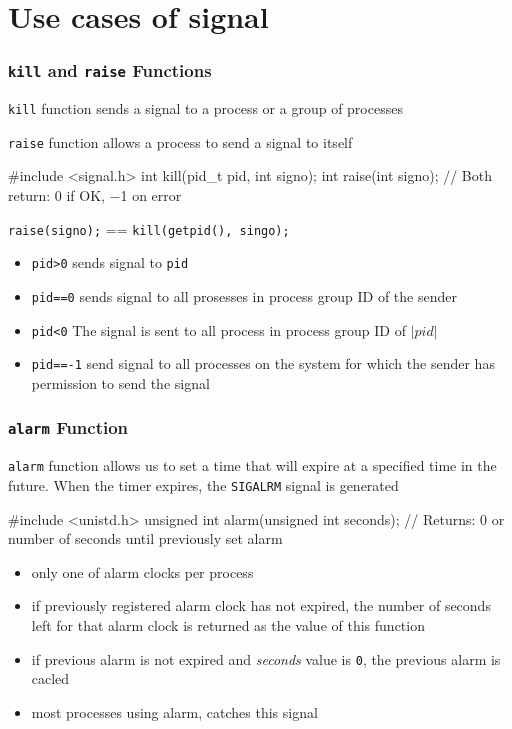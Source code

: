 \documentclass[newPxFont,sthlmFooter,nooffset]{beamer}
\begin{document}
\section{Use cases of signal}



\begin{frame}[fragile,t]
  \frametitle{\texttt{kill} and \texttt{raise} Functions}
\texttt{kill} function sends a signal to a process or a group of processes

\texttt{raise} function allows a process to send a signal to itself

\begin{codedef}
#include <signal.h>
int kill(pid_t pid, int signo); 
int raise(int signo);
// Both return: 0 if OK, −1 on error
\end{codedef}

{\hfill \texttt{raise(signo);} == \texttt{kill(getpid(), singo);}\hfill}

\begin{itemize}
\item \texttt{pid>0} sends signal to \texttt{pid}
\item \texttt{pid==0} sends signal to all prosesses in process group ID of the sender
\item \texttt{pid<0} The signal is sent to all process in process group ID of $|pid|$
\item \texttt{pid==-1} send signal to all processes on the system for which the sender has permission to send the signal
\end{itemize}
\end{frame}



\begin{frame}[fragile,t]
  \frametitle{\texttt{alarm} Function}
\texttt{alarm} function allows us to set a time that will expire at a specified time in the future. When the timer expires, the \texttt{SIGALRM} signal is generated
\begin{codedef}
#include <unistd.h>
unsigned int alarm(unsigned int seconds);
// Returns: 0 or number of seconds until previously set alarm  
\end{codedef}

\begin{itemize}
\item only one of alarm clocks per process
\item if previously registered alarm clock has not expired, the number of seconds left for that alarm clock is returned as the value of this function
\item if previous alarm is not expired and \textit{seconds} value is \texttt{0}, the previous alarm is cacled
\item most processes using alarm, catches this signal
\end{itemize}
\end{frame}
\end{document}
